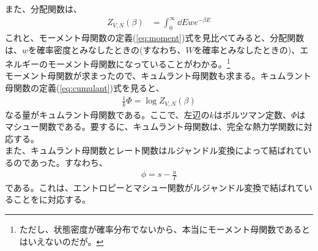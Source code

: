 \documentclass[a4paper,11pt]{jsarticle}
\numberwithin{equation}{section}
\begin{document}
また、分配関数は、
\begin{align}
  Z_{V,N}(\beta) &= \int_{0}^{\infty}\dd E w e^{-\beta E}
\end{align}
これと、モーメント母関数の定義(\ref{eq:moment})式を見比べてみると、分配関数は、$w$を確率密度とみなしたときの(すなわち、$W$を確率とみなしたときの)、エネルギーのモーメント母関数になっていることがわかる。\footnote{ただし、状態密度が確率分布でないから、本当にモーメント母関数であるとはいえないのだが。}\\
モーメント母関数が求まったので、キュムラント母関数も求まる。キュムラント母関数の定義(\ref{eq:cumulant})式を見ると、
\begin{align}
  \frac{1}{k}\Phi = \log Z_{V,N}(\beta)
\end{align}
なる量がキュムラント母関数である。ここで、左辺の$k$はボルツマン定数、$\Phi$はマシュー関数である。要するに、キュムラント母関数は、完全な熱力学関数に対応する。\\

また、キュムラント母関数とレート関数はルジャンドル変換によって結ばれているのであった。すなわち、
\begin{align}
  \phi = s - \frac{u}{T}
\end{align}
である。これは、エントロピーとマシュー関数がルジャンドル変換で結ばれていることをに対応する。\\
\end{document}
